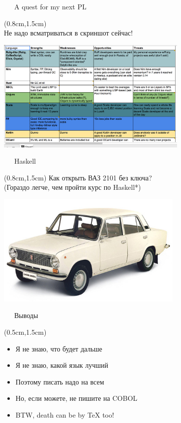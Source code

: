 \documentclass[xetex,18pt,aspectratio=43]{beamer}
\begin{document}
\begin{Large}
\begin{frame}{\ \ \ A quest for my next PL}
\begin{textblock*}{\framewidth}(0.8cm,1.5cm)
  \href{https://goo.gl/MS1UfB}{\color{blue}{https://goo.gl/MS1UfB}}\\
  Не надо всматриваться в скриншот сейчас!
\begin{minipage}{\textwidth}
  \centering
  \includegraphics[height=5.5cm]{img/quest.png}
\end{minipage}
\end{textblock*}
\end{frame}

\begin{frame}{\ \ \ Haskell}
\begin{textblock*}{\framewidth}(0.8cm,1.5cm)
Как открыть ВАЗ 2101 без ключа?\\
{\small (Гораздо легче, чем пройти курс по Haskell*)}
\begin{minipage}{\textwidth}
  \centering
  \includegraphics[height=5.5cm]{img/lada_2101_1.jpg}
\end{minipage}
\end{textblock*}
\end{frame}

\begin{frame}{\ \ \ Выводы}
\begin{textblock*}{\framewidth-0.8cm}(0.5cm,1.5cm)
\begin{itemize}
  \item Я не знаю, что будет дальше
  \item Я не знаю, какой язык лучший
  \item Поэтому писать надо на всем
  \item Но, если можете, не пишите на COBOL
  \item BTW, death can be by {\TeX} too!
\end{itemize}
\end{textblock*}
\end{frame}


\end{Large}
\end{document}
